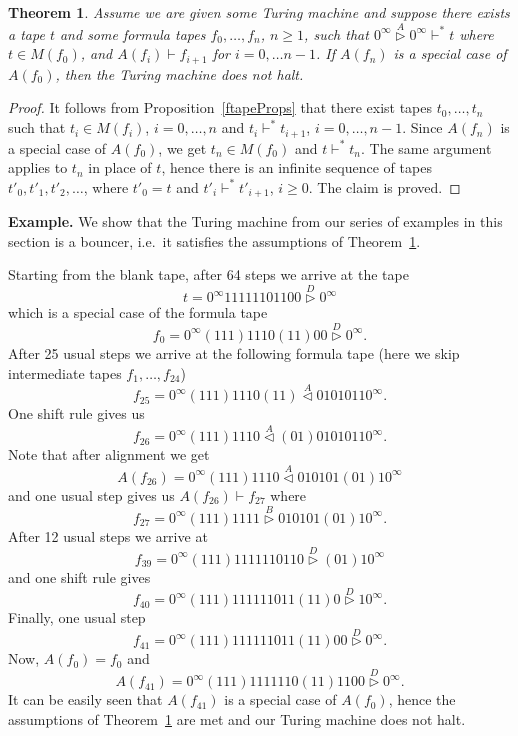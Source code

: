 \documentclass{article}
\newtheorem{theorem}{Theorem}
\newcommand{\lhead}[1]{\stackrel{#1}\triangleleft}
\newcommand{\rhead}[1]{\stackrel{#1}\triangleright}
\begin{document}
\begin{theorem}\label{bouncers}
	Assume we are given some Turing machine and suppose there exists a tape \( t \) and some formula tapes \( f_0, \dots, f_n \), \( n \geq 1 \),
	such that \( 0^\infty \rhead{A} 0^\infty \vdash^* t \) where \( t \in M(f_0) \), and \( A(f_i) \vdash f_{i+1} \) for \( i = 0, \dots n-1 \).
	If \( A(f_n) \) is a special case of \( A(f_0) \), then the Turing machine does not halt.
\end{theorem}
\begin{proof}
	It follows from Proposition~\ref{ftapeProps} that there exist tapes \( t_0, \dots, t_n \) such that \( t_i \in M(f_i) \), \( i = 0, \dots, n \)
	and \( t_i \vdash^* t_{i+1} \), \( i = 0, \dots, n-1 \). Since \( A(f_n) \) is a special case of \( A(f_0) \), we get \( t_n \in M(f_0) \)
	and \( t \vdash^* t_n \). The same argument applies to \( t_n \) in place of \( t \), hence there is an infinite sequence of tapes \( t'_0, t'_1, t'_2, \dots \),
	where \( t'_0 = t \) and \( t'_i \vdash^* t'_{i+1} \), \( i \geq 0 \). The claim is proved.
\end{proof}

\noindent\textbf{Example.} We show that the Turing machine from our series of examples in this section is a bouncer, i.e.\ it satisfies the assumptions of Theorem~\ref{bouncers}.

Starting from the blank tape, after 64 steps we arrive at the tape
\[ t = 0^\infty 11111101100 \rhead{D} 0^\infty \]
which is a special case of the formula tape
\[ f_0 = 0^\infty (111) 1110 (11) 00 \rhead{D} 0^\infty. \]
After 25 usual steps we arrive at the following formula tape (here we skip intermediate tapes \( f_1, \dots, f_{24} \))
\[ f_{25} = 0^\infty (111) 1110 (11) \lhead{A} 0101011 0^\infty. \]
One shift rule gives us
\[ f_{26} = 0^\infty (111) 1110 \lhead{A} (01) 0101011 0^\infty. \]
Note that after alignment we get
\[ A(f_{26}) = 0^\infty (111) 1110 \lhead{A} 010101 (01) 1 0^\infty \]
and one usual step gives us \( A(f_{26}) \vdash f_{27} \) where
\[ f_{27} = 0^\infty (111) 1111 \rhead{B} 010101 (01) 1 0^\infty. \]
After 12 usual steps we arrive at
\[ f_{39} = 0^\infty (111) 1111110110 \rhead{D} (01) 1 0^\infty \]
and one shift rule gives
\[ f_{40} = 0^\infty (111) 111111011 (11) 0 \rhead{D} 1 0^\infty. \]
Finally, one usual step
\[ f_{41} = 0^\infty (111) 111111011 (11) 00 \rhead{D} 0^\infty. \]
Now, \( A(f_0) = f_0 \) and
\[ A(f_{41}) = 0^\infty (111) 1111110 (11) 1100 \rhead{D} 0^\infty. \]
It can be easily seen that \( A(f_{41}) \) is a special case of \( A(f_0) \), hence the assumptions of Theorem~\ref{bouncers} are met and our Turing machine does not halt.
\end{document}
